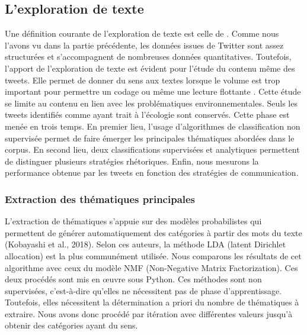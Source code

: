 \subsection{L'exploration de texte}
\label{twitter:exploration}
    Une définition courante de l’exploration de texte est celle de \textcite[][p. 1]{kao2010natural} . Comme nous l’avons vu dans la partie précédente, les données issues de Twitter sont assez structurées et s’accompagnent de nombreuses données quantitatives. Toutefois, l’apport de l’exploration de texte est évident pour l’étude du contenu même des tweets. Elle permet de donner du sens aux textes lorsque le volume est trop important pour permettre un codage ou même une lecture flottante \parencite{kobayashi2018text}. Cette étude se limite au contenu en lien avec les problématiques environnementales. Seuls les tweets identifiés comme ayant trait à l'écologie sont conservés. Cette phase est menée en trois temps. En premier lieu, l'usage d'algorithmes de classification non supervisée permet de faire émerger les principales thématiques abordées dans le corpus. En second lieu, deux classifications supervisées et analytiques permettent de distinguer plusieurs stratégies rhétoriques. Enfin, nous mesurons la performance obtenue par les tweets en fonction des stratégies de communication.


    \subsubsection{Extraction des thématiques principales}
    \label{twitter:thematiques}
        L’extraction de thématiques s’appuie sur des modèles probabilistes qui permettent de générer automatiquement des catégories à partir des mots du texte (Kobayashi et al., 2018). Selon ces auteurs, la méthode LDA (latent Dirichlet allocation) est la plus communément utilisée. Nous comparons les résultats de cet algorithme avec ceux du modèle NMF (Non-Negative Matrix Factorization). Ces deux procédés sont mis en œuvre sous Python.
        Ces méthodes sont non supervisées, c'est-à-dire qu’elles ne nécessitent pas de phase d’apprentissage. Toutefois, elles nécessitent la détermination a priori du nombre de thématiques à extraire. Nous avons donc procédé par itération avec différentes valeurs jusqu’à obtenir des catégories ayant du sens.


